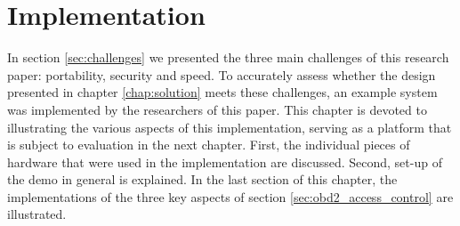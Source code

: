 
\chapter{Implementation}

In section \ref{sec:challenges} we presented the three main challenges of this research paper: portability, security and speed. To accurately assess whether the design presented in chapter \ref{chap:solution} meets these challenges, an example system was implemented by the researchers of this paper. This chapter is devoted to illustrating the various aspects of this implementation, serving as a platform that is subject to evaluation in the next chapter. First, the individual pieces of hardware that were used in the implementation are discussed. Second, set-up of the demo in general is explained. In the last section of this chapter, the implementations of the three key aspects of section \ref{sec:obd2_access_control} are illustrated.

